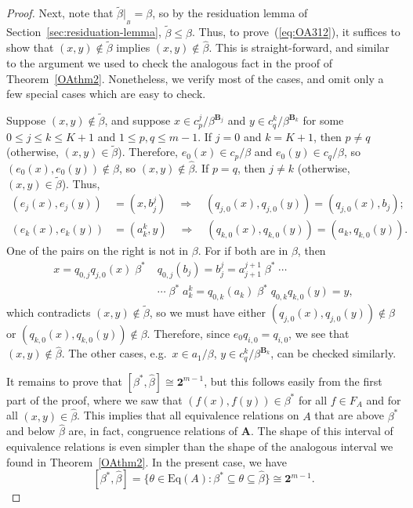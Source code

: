 \documentclass[cm,dissertation,actual,final]{uhthesis}
\theoremstyle{plain}
\theoremstyle{definition}
\theoremstyle{remark}
\numberwithin{theorem}{section}
\numberwithin{claim}{chapter}
\numberwithin{equation}{section}
\numberwithin{conjecture}{chapter}
\newcommand{\<}{\ensuremath{\langle}}
\renewcommand{\>}{\ensuremath{\rangle}}
\renewcommand{\leq}{\ensuremath{\leqslant}}
\newcommand{\Eq}{\ensuremath{\mathrm{Eq}}}
\newcommand{\0}{\ensuremath{\mathbf{0}}}
\newcommand{\1}{\ensuremath{\mathbf{1}}}
\newcommand{\2}{\ensuremath{\mathbf{2}}}
\newcommand{\3}{\ensuremath{\mathbf{3}}}
\newcommand{\4}{\ensuremath{\mathbf{4}}}
\newcommand{\5}{\ensuremath{\mathbf{5}}}
\newcommand{\bA}{\ensuremath{\mathbf{A}}}
\newcommand{\bB}{\ensuremath{\mathbf{B}}}
\newcommand{\resB}{\ensuremath{|_{_B}}}
\newcommand{\two}{\ensuremath{\mathbf{2}}}
\newcommand{\tbeta}{\ensuremath{\widetilde{\beta}}}
\begin{document}
\begin{proof}
  Next, note that $\widetilde{\beta}\resB = \beta$, so
  by the residuation lemma of Section~\ref{sec:residuation-lemma}, 
  $\widetilde{\beta} \leq \widehat{\beta}$.  
  Thus, to 
  prove~(\ref{eq:OA312}), it suffices to show that 
  $(x,y)\notin \widetilde{\beta}$ implies 
  $(x,y)\notin \widehat{\beta}$.  This is straight-forward, and 
  similar to the argument we used to check the analogous fact in the proof of
  Theorem~\ref{OAthm2}.  Nonetheless, we verify most of the cases, 
  and omit only a few special cases which are easy to check.

  Suppose $(x,y)\notin \widetilde{\beta}$, and suppose
  $x\in c_p^j/\beta^{\bB_j}$ and
  $y\in c_q^k/\beta^{\bB_k}$ for some $0\leq j \leq k \leq K+1$ and $1\leq p, q
  \leq m-1$.  If $j=0$ and $k=K+1$, then $p\neq q$
  (otherwise, $(x,y) \in \tbeta$).  
  Therefore, $e_0(x) \in c_p/\beta$ and 
  $e_0(y) \in c_q/\beta$, so 
  $(e_{0}(x), e_{0}(y)) \notin \beta$, so
  $(x, y) \notin \widehat{\beta}$.
  If $p=q$, then $j\neq k$
  (otherwise, $(x,y) \in \tbeta$).  Thus,
  \begin{align*}
    (e_j(x), e_j(y)) &= (x, b^j_j) \quad \Rightarrow \quad (q_{j,0}(x), q_{j,0}(y))= (q_{j,0}(x), b_{j});\\
    (e_k(x), e_k(y)) &= (a^k_k,y) \quad \Rightarrow \quad (q_{k,0}(x), q_{k,0}(y))= (a_{k}, q_{k,0}(y)).
  \end{align*}
  One of the pairs on the right is not in $\beta$.  For if both are in $\beta$, then 
  \begin{align*}
    x = q_{0,j}q_{j,0}(x) 
    \; \beta^* \; &
    q_{0,j}(b_{j}) = b^{j}_{j} = a^{j+1}_{j+1} 
    \; \beta^* \; \cdots\\
    &\cdots \; \beta^* \;
    a^{k}_{k}  = q_{0,k}(a_{k})
    \; \beta^* \;
    q_{0,k}q_{k,0}(y) = y,
  \end{align*}
  which contradicts $(x,y)\notin \tbeta$,
  so we must have either $(q_{j,0}(x), q_{j,0}(y))\notin \beta$ or 
  $(q_{k,0}(x), q_{k,0}(y)) \notin \beta$.  Therefore,
  since $e_0 q_{i,0} = q_{i,0}$, we see that
  $(x,y)\notin \widehat{\beta}$.
  The other cases, e.g.~$x\in a_1/\beta$, 
  $y\in c_q^k/\beta^{\bB_k}$, can be checked similarly.

  It remains to prove that $[\beta^*, \widehat{\beta}] \cong \two^{m-1}$, but this
  follows easily from the first part of the proof, where we saw that $(f(x), f(y))\in
  \beta^*$ for all $f\in F_A$ and for all $(x,y)\in \widehat{\beta}$.
  This implies that all equivalence relations on $A$ that are above $\beta^*$ and below
  $\widehat{\beta}$ are, in fact, congruence relations of $\bA$.  The shape of
  this interval of equivalence relations is even simpler than the shape of the
  analogous interval we found in Theorem~\ref{OAthm2}.  In the present case, we
  have 
  \[
    [\beta^*, \widehat{\beta}] = \{\theta \in \Eq(A) : \beta^* \subseteq \theta \subseteq \widehat{\beta} \}
    \cong \two^{m-1}.
    \]
\end{proof}
\end{document}
